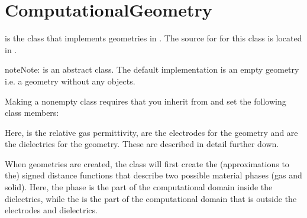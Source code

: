 \documentclass[letterpaper,10pt,english]{sphinxmanual}
\begin{document}
\section{ComputationalGeometry}
\label{\detokenize{Source/ComputationalGeometry:computationalgeometry}}\label{\detokenize{Source/ComputationalGeometry:chap-computationalgeometry}}\label{\detokenize{Source/ComputationalGeometry::doc}}
\sphinxAtStartPar
{} is the class that implements geometries in .
The source for for this class is located in .

\begin{sphinxadmonition}{note}{Note:}
\sphinxAtStartPar
{} is  an abstract class.
The default implementation is an empty geometry \textendash{} i.e. a geometry without any objects.
\end{sphinxadmonition}

\sphinxAtStartPar
Making a non\sphinxhyphen{}empty  class requires that you inherit from  and set the following class members:

\begin{sphinxVerbatim}[commandchars=\\\{\},formatcom=\scriptsize]
 
 
 
\end{sphinxVerbatim}

\sphinxAtStartPar
Here,  is the relative gas permittivity,  are the electrodes for the geometry and  are the dielectrics for the geometry.
These are described in detail further down.

\sphinxAtStartPar
When geometries are created, the  class will first create the (approximations to the) signed distance functions that describe two possible material phases (gas and solid).
Here, the  phase is the part of the computational domain inside the dielectrics, while the  is the part of the computational domain that is outside the electrodes and dielectrics.
\end{document}

